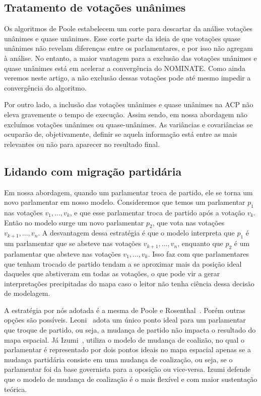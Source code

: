 \documentclass[a4paper, 12pt]{article}
\newcommand\nominate{NOMINATE\xspace}
\begin{document}
\subsection{Tratamento de votações unânimes}

Os algoritmos de Poole estabelecem um corte para descartar da análise votações unânimes e quase unânimes. Esse corte parte da ideia de que votações quase unânimes não revelam diferenças entre os parlamentares, e por isso não agregam à análise. No entanto, a maior vantagem para a exclusão das votações unânimes e quase unânimes está em acelerar a convergência do \nominate. Como ainda veremos neste artigo, a não exclusão dessas votações pode até mesmo impedir a convergência do algoritmo.

Por outro lado, a inclusão das votações unânimes e quase unânimes na ACP não eleva gravemente o tempo de execução. Assim sendo, em nossa abordagem não excluímos votações unânimes ou quase-unânimes. As variâncias e covariâncias se ocuparão de, objetivamente, definir se aquela informação está entre as mais relevantes ou não para aparecer no resultado final.

\subsection{Lidando com migração partidária}

Em nossa abordagem, quando um parlamentar troca de partido, ele se torna um novo parlamentar em nosso modelo. Consideremos que temos um parlamentar $p_1$ nas votações $v_1, ..., v_k$, e que esse parlamentar troca de partido após a votação $v_k$. Então no modelo surge um novo parlamentar $p_2$, que vota nas votações $v_{k+1}, ..., v_n$. A desvantagem dessa estratégia é que o modelo interpreta que $p_1$ é um parlamentar que se absteve nas votações $v_{k+1}, ..., v_n$, enquanto que $p_2$ é um parlamentar que absteve nas votações $v_1, ..., v_k$. Isso faz com que parlamentares que tenham trocado de partido tendam a se aproximar mais da posição ideal daqueles que abstiveram em todas as votações, o que pode vir a gerar interpretações precipitadas do mapa caso o leitor não tenha ciência dessa decisão de modelagem.

A estratégia por nós adotada é a mesma de Poole e Rosenthal~\cite{poole2007ideology}. Porém outras opções são possíveis. Leoni~\cite{leoni02cdep} adota um único ponto ideal para um parlamentar que troque de partido, ou seja, a mudança de partido não impacta o resultado do mapa espacial. Já Izumi~\cite{izumi2016senado}, utiliza o modelo de mudança de coalizão, no qual o parlamentar é representado por dois pontos ideais no mapa espacial apenas se a mudança partidária consiste em uma mudança de coalização, ou seja, se o parlamentar foi da base governista para a oposição ou vice-versa. Izumi defende que o modelo de mudança de coalização é o mais flexível e com maior sustentação teórica. 
\end{document}
